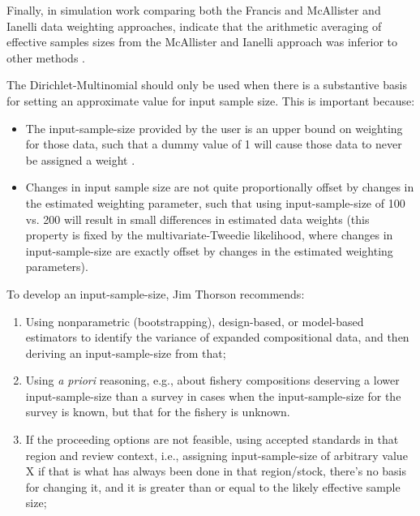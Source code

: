 Finally, in simulation work comparing both the Francis and McAllister and Ianelli data weighting approaches, indicate that the arithmetic averaging of effective samples sizes from the McAllister and Ianelli approach was inferior to other methods \citep{punt_insights_2016}.

\hypertarget{DM}{}

The Dirichlet-Multinomial should only be used when there is a
substantive basis for setting an approximate value for input sample
size.  This is important because: 

\begin{itemize}

\item The input-sample-size provided by the user is an upper bound on
weighting for those data, such that a dummy value of 1 will cause those
data to never be assigned a weight .

\item Changes in input sample size are not quite proportionally
offset by changes in the estimated weighting parameter, such that
using input-sample-size of 100 vs. 200 will result in small differences
in estimated data weights (this property is fixed by the
multivariate-Tweedie likelihood, where changes in input-sample-size are
exactly offset by changes in the estimated weighting parameters).   

\end{itemize}

To develop an input-sample-size, Jim Thorson recommends:

\begin{enumerate}

\item Using nonparametric (bootstrapping), design-based, or model-based
estimators to identify the variance of expanded compositional data, and
then deriving an input-sample-size from that; 

\item Using \textit{a priori} reasoning, e.g., about fishery compositions
deserving a lower input-sample-size than a survey in cases when the
input-sample-size for the survey is known, but that for the fishery is
unknown. 

\item If the proceeding options are not feasible, using accepted
standards in that region and review context, i.e., assigning
input-sample-size of arbitrary value X if that is what has always been
done in that region/stock, there's no basis for changing it, and it is
greater than or equal to the likely effective sample size; 

\end{enumerate}

